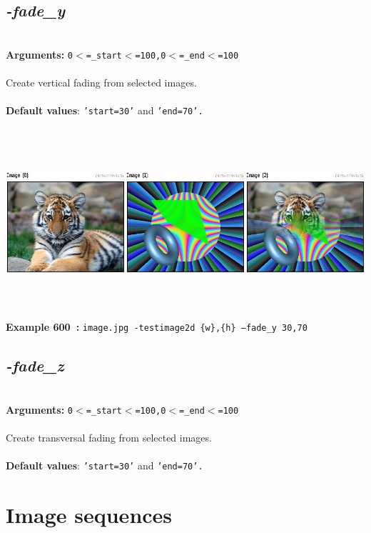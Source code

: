 \documentclass[a4paper,11pt,twoside]{book}
\begin{document}
\subsection{\emph{-fade\_y} }\vspace*{-0.5em}
~\\\textbf{Arguments: } 
{\small \texttt{0$<$=\_start$<$=100,0$<$=\_end$<$=100}}\\~\\
Create vertical fading from selected images.
~\\~\\\textbf{Default values}: {\small \texttt{'start=30'} and \texttt{'end=70'.}}
\begin{center}\includegraphics[keepaspectratio=true,height=7cm,width=\textwidth]{img/gmic_def600.jpg}\\
{\footnotesize \textbf{Example 600~:} \texttt{image.jpg -testimage2d \{w\},\{h\} --fade\_y 30,70}}
\end{center}

\subsection{\emph{-fade\_z} }\vspace*{-0.5em}
~\\\textbf{Arguments: } 
{\small \texttt{0$<$=\_start$<$=100,0$<$=\_end$<$=100}}\\~\\
Create transversal fading from selected images.
~\\~\\\textbf{Default values}: {\small \texttt{'start=30'} and \texttt{'end=70'.}}

\section{Image sequences}
\end{document}
